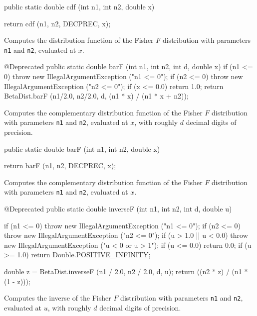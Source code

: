 \begin{code}

   public static double cdf (int n1, int n2, double x)\begin{hide} {
       return cdf (n1, n2, DECPREC, x);
   }\end{hide}
\end{code}
\begin{tabb}
Computes the distribution function of the Fisher $F$ distribution with 
parameters \texttt{n1} and \texttt{n2}, evaluated at $x$.
\end{tabb}
\begin{hide}\begin{code}

   @Deprecated
   public static double barF (int n1, int n2, int d, double x) {
      if (n1 <= 0)
         throw new IllegalArgumentException ("n1 <= 0");
      if (n2 <= 0)
         throw new IllegalArgumentException ("n2 <= 0");
      if (x <= 0.0)
         return 1.0;
      return BetaDist.barF (n1/2.0, n2/2.0, d, (n1 * x) / (n1 * x + n2));
   }
\end{code}
\begin{tabb}
Computes the complementary distribution function of the Fisher $F$ distribution
with parameters \texttt{n1} and \texttt{n2}, evaluated at $x$, with roughly
 $d$ decimal digits of precision.
\end{tabb}\end{hide}
\begin{code}

   public static double barF (int n1, int n2, double x)\begin{hide} {
       return barF (n1, n2, DECPREC, x);      
   }\end{hide}
\end{code}
\begin{tabb}
Computes the complementary distribution function of the Fisher $F$ distribution
with parameters \texttt{n1} and \texttt{n2}, evaluated at $x$.
\end{tabb}
\begin{hide}\begin{code}

   @Deprecated
   public static double inverseF (int n1, int n2, int d, double u) {
      if (n1 <= 0)
         throw new IllegalArgumentException ("n1 <= 0");
      if (n2 <= 0)
         throw new IllegalArgumentException ("n2 <= 0");
      if (u > 1.0 || u < 0.0)
         throw new IllegalArgumentException ("u < 0 or u > 1");
      if (u <= 0.0)
         return 0.0;
      if (u >= 1.0)
         return Double.POSITIVE_INFINITY;

      double z = BetaDist.inverseF (n1 / 2.0, n2 / 2.0, d, u);
      return ((n2 * z) / (n1 * (1 - z)));
   }
\end{code}
\begin{tabb}
Computes the inverse of the Fisher $F$ distribution with parameters \texttt{n1}
 and \texttt{n2}, evaluated at $u$, with roughly $d$ decimal digits of
 precision.
\end{tabb}\end{hide}
